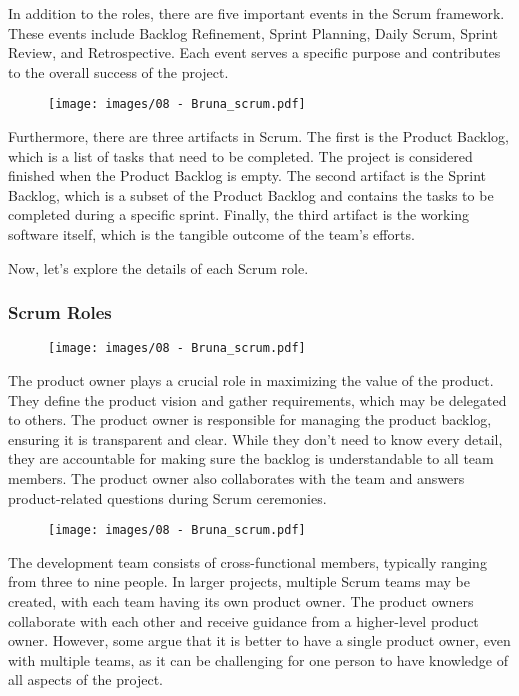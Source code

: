 In addition to the roles, there are five important events in the Scrum
framework. These events include Backlog Refinement, Sprint Planning,
Daily Scrum, Sprint Review, and Retrospective. Each event serves a
specific purpose and contributes to the overall success of the project.

\begin{figure}[!h]
    \centering
    \texttt{[image: images/08 - Bruna\_scrum.pdf]}
\end{figure}

Furthermore, there are three artifacts in Scrum. The first is the
Product Backlog, which is a list of tasks that need to be completed. The
project is considered finished when the Product Backlog is empty. The
second artifact is the Sprint Backlog, which is a subset of the Product
Backlog and contains the tasks to be completed during a specific sprint.
Finally, the third artifact is the working software itself, which is the
tangible outcome of the team's efforts.

Now, let's explore the details of each Scrum role.

\subsubsection{Scrum Roles}

\begin{figure}[!h]
    \centering
    \texttt{[image: images/08 - Bruna\_scrum.pdf]}
\end{figure}

The product owner plays a crucial role in maximizing the value of the
product. They define the product vision and gather requirements, which
may be delegated to others. The product owner is responsible for
managing the product backlog, ensuring it is transparent and clear.
While they don't need to know every detail, they are accountable for
making sure the backlog is understandable to all team members. The
product owner also collaborates with the team and answers
product-related questions during Scrum ceremonies.

\begin{figure}[!h]
    \centering
    \texttt{[image: images/08 - Bruna\_scrum.pdf]}
\end{figure}

The development team consists of cross-functional members, typically
ranging from three to nine people. In larger projects, multiple Scrum
teams may be created, with each team having its own product owner. The
product owners collaborate with each other and receive guidance from a
higher-level product owner. However, some argue that it is better to
have a single product owner, even with multiple teams, as it can be
challenging for one person to have knowledge of all aspects of the
project.

